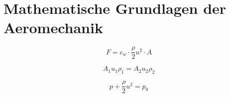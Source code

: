 \section{Mathematische Grundlagen der Aeromechanik}

\begin{equation} \label{Kraft}
    F = c_w \cdot \frac{\rho}{2}u^2\cdot A
\end{equation}
    
\begin{equation} \label{Kontinuitaetsgleichung}
    A_1u_1\rho_1 = A_2u_2\rho_2
\end{equation}

\begin{equation} \label{Kraft}
    p + \frac{\rho}{2}u^2 = p_0
\end{equation}